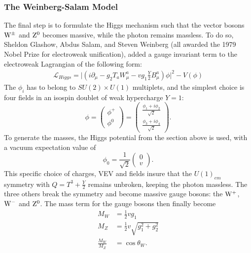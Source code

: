 \subsubsection{The Weinberg-Salam Model}
The final step is to formulate the Higgs mechanism such that the vector bosons $\mathrm{W}^{\pm}$ and $\mathrm{Z}^{0}$ becomes massive, while the photon remains massless. To do so, Sheldon Glashow, Abdus Salam, and Steven Weinberg (all awarded the 1979 Nobel Prize for electroweak unification), added a gauge invariant term to the electroweak Lagrangian of the following form:
 \begin{align}
   \label{eq:theory:higgsmass}
  \mathcal{L}_{Higgs}= \big|(i\partial_{\mu} - g_2 T_a W_{\mu}^a -vg_1 \frac{Y}{2} B_{\mu}^a) \phi\big| ^2-V(\phi)
 \end{align}
The $\phi_i$ has to belong to $SU(2) \times U(1)$ multiplets, and the simplest choice is four fields in an isospin doublet of weak hypercharge $Y=1$:
\begin{equation}
\phi =  \begin{pmatrix} \phi^{+} \\ \phi^{0} \end{pmatrix}= \begin{pmatrix} \frac{\phi_1+i\phi_2}{\sqrt{2}} \\ \frac{\phi_3+i\phi_4}{\sqrt{2}}\end{pmatrix}.
\end{equation}
To generate the masses, the Higgs potential from the section above is used, with a vacuum expectation value of
\begin{equation}
\phi_0 = \frac{1}{\sqrt{2}}  \begin{pmatrix} 0 \\ v \end{pmatrix}.
\end{equation}
This specific choice of charges, VEV and fields insure that the $U(1)_{em}$ symmetry with $Q=T^3+\frac{Y}{2}$ remains unbroken, keeping the photon massless. The three others break the symmetry and become massive gauge bosons: the $\mathrm{W}^{+}$, $\mathrm{W}^{-}$ and $\mathrm{Z}^{0}$. The mass term for the gauge bosons then finally become
\begin{align}
M_W            &=\frac{1}{2}vg_1\\
M_Z            &=\frac{1}{2}v\sqrt{g_1^2+g_2^2}\\
\frac{M_W}{M_Z}&=\cos \theta_W.
\end{align}

